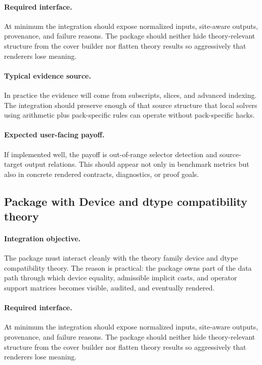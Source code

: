 \documentclass[11pt]{report}
\DeclareRobustCommand{\py}[1]{\texttt{\detokenize{#1}}}
\theoremstyle{definition}
\theoremstyle{plain}
\begin{document}
\paragraph{Required interface.}
At minimum the integration should expose normalized inputs, site-aware
outputs, provenance, and failure reasons. The package should neither hide
theory-relevant structure from the cover builder nor flatten theory
results so aggressively that renderers lose meaning.

\paragraph{Typical evidence source.}
In practice the evidence will come from subscripts, slices, and advanced indexing. The integration should
preserve enough of that source structure that local solvers using arithmetic plus pack-specific rules
can operate without pack-specific hacks.

\paragraph{Expected user-facing payoff.}
If implemented well, the payoff is out-of-range selector detection and source-target output relations. This should appear not only
in benchmark metrics but also in concrete rendered contracts,
diagnostics, or proof goals.


\subsection{Package \py{src/deppy/assist} with Device and dtype compatibility theory}

\paragraph{Integration objective.}
The package \py{src/deppy/assist} must interact cleanly with the
theory family device and dtype compatibility theory. The reason is practical: the
package owns part of the data path through which device equality, admissible implicit casts, and operator support matrices becomes
visible, audited, and eventually rendered.

\paragraph{Required interface.}
At minimum the integration should expose normalized inputs, site-aware
outputs, provenance, and failure reasons. The package should neither hide
theory-relevant structure from the cover builder nor flatten theory
results so aggressively that renderers lose meaning.
\end{document}
